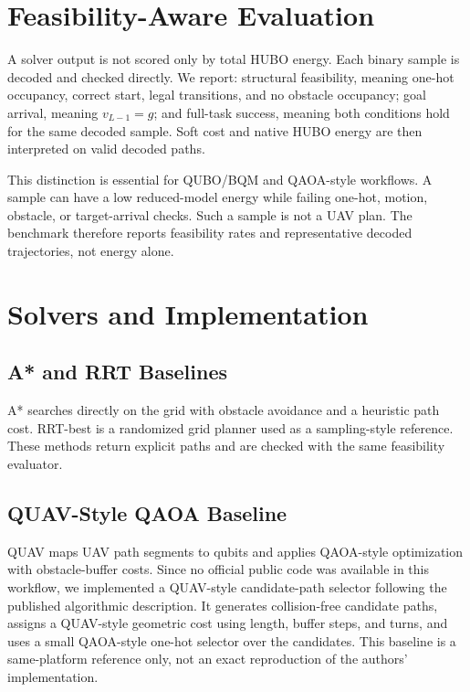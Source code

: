 \documentclass[10pt,conference]{IEEEtran}
\begin{document}
\section{Feasibility-Aware Evaluation}
A solver output is not scored only by total HUBO energy. Each binary sample is decoded and checked directly. We report: structural feasibility, meaning one-hot occupancy, correct start, legal transitions, and no obstacle occupancy; goal arrival, meaning $v_{L-1}=g$; and full-task success, meaning both conditions hold for the same decoded sample. Soft cost and native HUBO energy are then interpreted on valid decoded paths.

This distinction is essential for QUBO/BQM and QAOA-style workflows. A sample can have a low reduced-model energy while failing one-hot, motion, obstacle, or target-arrival checks. Such a sample is not a UAV plan. The benchmark therefore reports feasibility rates and representative decoded trajectories, not energy alone.

\section{Solvers and Implementation}
\subsection{A* and RRT Baselines}
A* searches directly on the grid with obstacle avoidance and a heuristic path cost. RRT-best is a randomized grid planner used as a sampling-style reference. These methods return explicit paths and are checked with the same feasibility evaluator.

\subsection{QUAV-Style QAOA Baseline}
QUAV maps UAV path segments to qubits and applies QAOA-style optimization with obstacle-buffer costs. Since no official public code was available in this workflow, we implemented a QUAV-style candidate-path selector following the published algorithmic description. It generates collision-free candidate paths, assigns a QUAV-style geometric cost using length, buffer steps, and turns, and uses a small QAOA-style one-hot selector over the candidates. This baseline is a same-platform reference only, not an exact reproduction of the authors' implementation.
\end{document}
